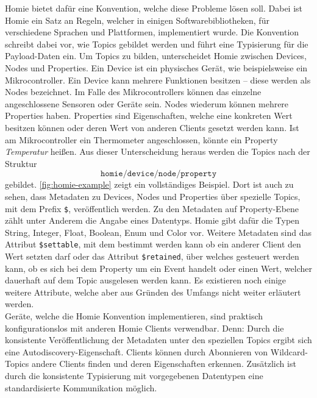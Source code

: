 Homie \cite{homie} bietet dafür eine Konvention, welche diese Probleme lösen soll. Dabei ist Homie
ein Satz an Regeln, welcher in einigen Softwarebibliotheken, für verschiedene
Sprachen und Plattformen, implementiert wurde. Die Konvention schreibt dabei vor, wie Topics 
gebildet werden und führt eine Typisierung für die Payload-Daten ein.
Um Topics zu bilden, unterscheidet Homie zwischen Devices, Nodes und Properties. Ein Device
ist ein physisches Gerät, wie beispielsweise ein Mikrocontroller.
Ein Device kann mehrere Funktionen besitzen -- diese werden als Nodes
bezeichnet. Im Falle des Mikrocontrollers können das einzelne angeschlossene Sensoren
oder Geräte sein. Nodes wiederum können mehrere Properties haben. Properties sind Eigenschaften, welche 
eine konkreten Wert besitzen können oder deren Wert von anderen Clients gesetzt werden kann.
Ist am Mikrocontroller ein Thermometer angeschlossen, könnte ein Property \emph{Temperatur} heißen.
Aus dieser Unterscheidung heraus werden die Topics nach der Struktur
\[\texttt{homie/device/node/property} \]
gebildet. \autoref{fig:homie-example} zeigt ein vollständiges Beispiel. Dort ist auch zu sehen, dass 
Metadaten zu Devices, Nodes und Properties über spezielle Topics, mit dem Prefix \texttt{\$},
veröffentlich werden. Zu den Metadaten auf Property-Ebene zählt unter Anderem die Angabe eines
Datentyps. Homie gibt dafür die Typen String, Integer, Float, Boolean, Enum und Color vor.
Weitere Metadaten sind das Attribut \texttt{\$settable}, mit dem bestimmt werden kann
ob ein anderer Client den Wert setzten darf oder das Attribut \texttt{\$retained}, über 
welches gesteuert werden kann, ob es sich bei dem Property um ein Event handelt oder einen Wert,
welcher dauerhaft auf dem Topic ausgelesen werden kann. Es existieren noch einige weitere Attribute,
welche aber aus Gründen des Umfangs nicht weiter erläutert werden.\\
Geräte, welche die Homie Konvention implementieren, sind praktisch konfigurationslos mit anderen
Homie Clients verwendbar. Denn: Durch die konsistente Veröffentlichung der Metadaten unter 
den speziellen Topics ergibt sich eine Autodiscovery-Eigenschaft. Clients können durch Abonnieren
von Wildcard-Topics andere Clients finden und deren Eigenschaften erkennen. Zusätzlich ist durch die
konsistente Typisierung mit vorgegebenen Datentypen eine standardisierte Kommunikation möglich. 

\iffalse
- Ein Design Prinzip ist Einfachheit (mqtt.github.io)
- MQTT ist ein sehr simples Protokoll
- Aufbau von Topics kann beliebig geschehen. MQTT gibt keine Struktur vor
- Payloads können jegliche Encodierung haben

- typisiert Daten
- Metadaten über spezielle Topics die mit \$ starten
- Autodiscovery

- Unterscheidet zwischen device node und property
- Beispiel von Webseite
\fi